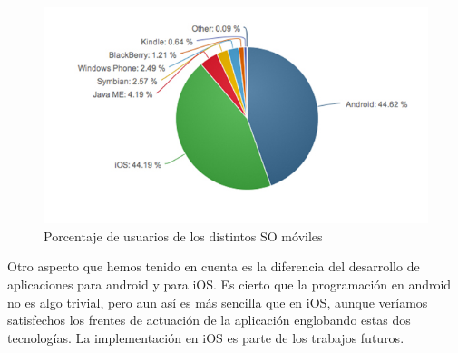 \begin{figure}
\centering
\includegraphics[scale=0.5]{./android/imagenes/porcentaje.jpg}
\caption{Porcentaje de usuarios de los distintos SO móviles}
\label{porcentajesandroid}
\end{figure}




Otro aspecto que hemos tenido en cuenta es la diferencia del desarrollo de aplicaciones para android y para iOS. Es cierto que la programación en android no es algo trivial, pero aun así es más sencilla que en iOS, aunque veríamos satisfechos los frentes de actuación de la aplicación englobando estas dos tecnologías. La implementación en iOS es parte de los trabajos futuros.


